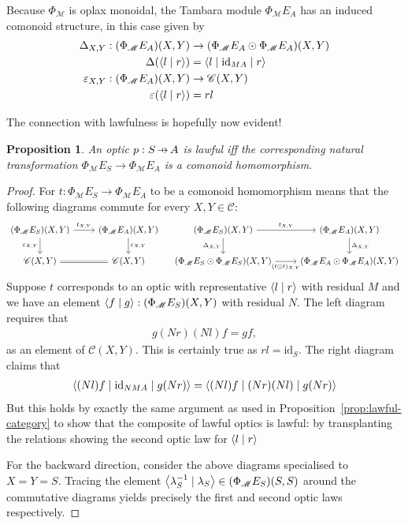 \documentclass[11pt,letterpaper]{article}
\theoremstyle{plain}
\newtheorem{proposition}[theorem]{Proposition}
\theoremstyle{definition}
\newcommand{\C}{\mathscr{C}}
\newcommand{\M}{\mathscr{M}}
\newcommand{\Pastro}{\Phi}
\newcommand{\id}{\mathrm{id}}
\newcommand{\rep}[2]{{\ensuremath \left\langle #1 \mid #2 \right\rangle}}
\newcommand{\repthree}[3]{{\ensuremath \langle #1 \mid #2 \mid #3 \rangle}}
\newcommand{\hto}{\ensuremath{\,\mathaccent\shortmid\rightarrow\,}}
\begin{document}
Because $\Pastro_\M$ is oplax monoidal, the Tambara module $\Pastro_\M E_A$ has an induced comonoid structure, in this case given by
\begin{align*}
  \Delta_{X, Y} : (\Pastro_\M E_A)(X, Y) &\to (\Pastro_\M E_A \odot \Pastro_\M E_A)(X, Y) \\
  \Delta(\rep{l}{r}) &= \repthree{l}{\id_{MA}}{r} \\
  \varepsilon_{X, Y} : (\Pastro_\M E_A)(X, Y) &\to \C(X, Y) \\
  \varepsilon(\rep{l}{r}) &= rl
\end{align*}

The connection with lawfulness is hopefully now evident!

\begin{proposition}\label{prop:lawful-if-homomorphism}
  An optic $p : S \hto A$ is lawful iff the corresponding natural transformation $\Pastro_\M E_S \rightarrow \Pastro_\M E_A$ is a comonoid homomorphism.
\end{proposition}
\begin{proof}
For $t : \Pastro_\M E_S \rightarrow \Pastro_\M E_A$ to be a comonoid homomorphism means that the following diagrams commute for every $X, Y \in \C$:
  \[
    \begin{tikzcd}
    (\Pastro_\M E_S)(X, Y) \ar[r, "t_{X, Y}"] \ar[d, "\varepsilon_{X,Y}" swap] & (\Pastro_\M E_A)(X, Y) \ar[d, "\varepsilon_{X,Y}"] \\
    \C(X, Y) \ar[r, equals] & \C(X, Y)
    \end{tikzcd}
    \quad
    \begin{tikzcd}
      (\Pastro_\M E_S)(X, Y) \ar[r, "t_{X, Y}"] \ar[d, "\Delta_{X, Y}" swap] & (\Pastro_\M E_A)(X, Y) \ar[d, "\Delta_{X, Y}"] \\
      (\Pastro_\M E_S \odot \Pastro_\M E_S)(X, Y) \ar[r, "(t \odot t)_{X, Y}" swap] & (\Pastro_\M E_A \odot \Pastro_\M E_A)(X, Y)
    \end{tikzcd}
  \]
  Suppose $t$ corresponds to an optic with representative $\rep{l}{r}$ with residual $M$ and we have an element $\rep{f}{g} : (\Pastro_\M E_S)(X, Y)$ with residual $N$. The left diagram requires that 
  \begin{align*}
  g(Nr)(Nl)f = gf,
  \end{align*}
  as an element of $\C(X, Y)$. This is certainly true as $rl = \id_S$. The right diagram claims that 
  \begin{align*}
  \repthree{(Nl)f}{\id_{NMA}}{g(N r)} = \repthree{(Nl)f}{(N r)(Nl)}{g(N r)}
  \end{align*}
  But this holds by exactly the same argument as used in Proposition~\ref{prop:lawful-category} to show that the composite of lawful optics is lawful: by transplanting the relations showing the second optic law for $\rep{l}{r}$

  For the backward direction, consider the above diagrams specialised to $X = Y = S$. Tracing the element $\rep{\lambda_S^{-1}}{\lambda_S} \in (\Pastro_\M E_S)(S, S)$ around the commutative diagrams yields precisely the first and second optic laws respectively.
\end{proof}
\end{document}
